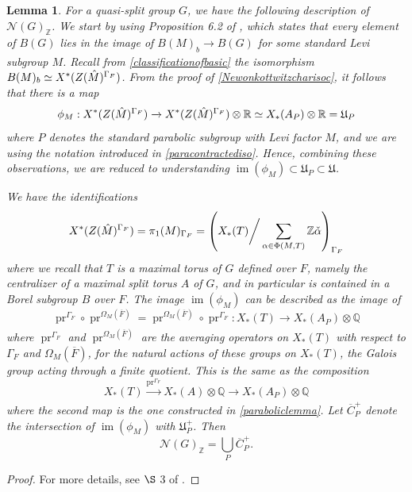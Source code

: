 \documentclass[11pt,a4paper]{article}
\theoremstyle{definition}
\theoremstyle{plain}
\newtheorem{Le}[shared]{Lemma}
\theoremstyle{remark}
\theoremstyle{plain}
\DeclareMathOperator{\pr}{pr}
\DeclareMathOperator{\im}{im}
\begin{document}
\begin{Le}\label{chailemma}
    For a quasi-split group $G$, we have the following description of $\mathcal{N}(G)_{\mathbb{Z}}$. We start by using Proposition 6.2 of \cite{MR809866}, which states that every element of $B(G)$ lies in the image of $B(M)_b \xrightarrow[]{} B(G)$ for some standard Levi subgroup $M$. Recall from \ref{classificationofbasic} the isomorphism $B(M)_b \simeq X^*(Z(\Hat{M})^{\Gamma_F})$. From the proof of \ref{Newonkottwitzcharisoc}, it follows that there is a map 
    \begin{equation*}
        \phi_M: X^*(Z(\Hat{M})^{\Gamma_F}) \xrightarrow[]{} X^*(Z(\Hat{M})^{\Gamma_F}) \otimes \mathbb{R} \simeq X_*(A_P) \otimes \mathbb{R} = \mathfrak{U}_P
    \end{equation*}
    where $P$ denotes the standard parabolic subgroup with Levi factor $M$, and we are using the notation introduced in \ref{paracontractediso}. Hence, combining these observations, we are reduced to understanding $\im(\phi_M) \subset \mathfrak{U}_P \subset \mathfrak{U}$.
    
    We have the identifications $$X^*(Z(\Hat{M})^{\Gamma_F}) = \pi_1(M)_{\Gamma_F} = \left( X_*(T) \bigg/ \sum_{\alpha \in \Phi(M,T)} \mathbb{Z} \Check{\alpha} \right)_{\Gamma_F}$$
    where we recall that $T$ is a maximal torus of $G$ defined over $F$, namely the centralizer of a maximal split torus $A$ of $G$, and in particular is contained in a Borel subgroup $B$ over $F$. The image $\im(\phi_M)$ can be described as the image of 
    $$\pr^{\Gamma_F} \circ \pr^{\Omega_M(\overline{F})} = \pr^{\Omega_M(\overline{F})} \circ \pr^{\Gamma_F}: X_*(T) \xrightarrow[]{} X_*(A_P) \otimes \mathbb{Q}$$
    where $\pr^{\Gamma_F}$ and $\pr^{\Omega_M(\overline{F})}$ are the averaging operators on $X_*(T)$ with respect to $\Gamma_F$ and $\Omega_M(\overline{F})$, for the natural actions of these groups on $X_*(T)$, the Galois group acting through a finite quotient. This is the same as the composition 
    $$X_*(T) \xrightarrow{\pr^{\Gamma_F}} X_*(A) \otimes \mathbb{Q} \xrightarrow[]{} X_*(A_P) \otimes \mathbb{Q}$$
    where the second map is the one constructed in \ref{paraboliclemma}. Let $\overline{C}_P^+$ denote the intersection of $\im(\phi_M)$ with $\mathfrak{U}_P^+$. Then $$\mathcal{N}(G)_{\mathbb{Z}} = \bigcup_P \overline{C}_P^+.$$
\end{Le}
\begin{proof}
    For more details, see $\S$ 3 of \cite{MR1781927}.
\end{proof}
\end{document}
